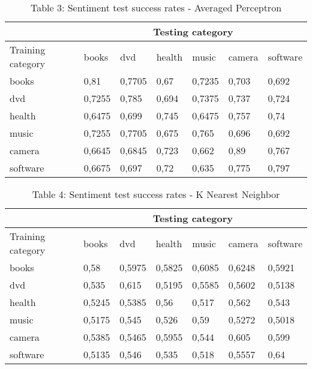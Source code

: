 \begin{table}[htdp]
\caption*{Table 3: Sentiment test success rates - Averaged Perceptron}
\begin{center}
\begin{tabular}{ | l | l | l | l | l | l | l |}

\hline
& \multicolumn{6}{|c|}{Testing category}\\
\hline
Training category &books &dvd &health  &music &camera  &software \\
\hline
books & 0,81  & 0,7705  & 0,67  & 0,7235  & 0,703 & 0,692 \\
dvd & 0,7255  & 0,785 & 0,694 & 0,7375  & 0,737 & 0,724 \\
health  & 0,6475  & 0,699 & 0,745 & 0,6475  & 0,757 & 0,74 \\
music & 0,7255  & 0,7705  & 0,675 & 0,765 & 0,696 & 0,692 \\
camera  & 0,6645  & 0,6845  & 0,723 & 0,662 & 0,89  & 0,767 \\
software  & 0,6675  & 0,697 & 0,72  & 0,635 & 0,775 & 0,797 \\
\hline

\end{tabular}
\end{center}
\label{default}
\end{table}

\begin{table}[htdp]
\caption*{Table 4: Sentiment test success rates - K Nearest Neighbor}
\begin{center}
\begin{tabular}{ | l | l | l | l | l | l | l |}

\hline
& \multicolumn{6}{|c|}{Testing category}\\
\hline
Training category &books &dvd &health  &music &camera  &software \\
\hline
books & 0,58  & 0,5975  & 0,5825  & 0,6085  & 0,6248  & 0,5921 \\
dvd & 0,535 & 0,615 & 0,5195  & 0,5585  & 0,5602  & 0,5138 \\
health  & 0,5245  & 0,5385  & 0,56  & 0,517 & 0,562 & 0,543 \\
music & 0,5175  & 0,545 & 0,526 & 0,59  & 0,5272  & 0,5018 \\
camera  & 0,5385  & 0,5465  & 0,5955  & 0,544 & 0,605 & 0,599 \\
software  & 0,5135  & 0,546 & 0,535 & 0,518 & 0,5557  & 0,64 \\
\hline

\end{tabular}
\end{center}
\label{default}
\end{table}


